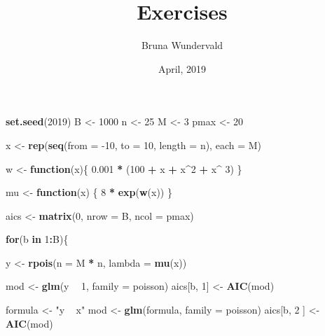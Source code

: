 \documentclass[]{article}
\title{Exercises}
\author{Bruna Wundervald}
\date{April, 2019}
\newenvironment{Shaded}{\begin{snugshade}}{\end{snugshade}}
\newcommand{\ControlFlowTok}[1]{\textcolor[rgb]{0.13,0.29,0.53}{\textbf{#1}}}
\newcommand{\DataTypeTok}[1]{\textcolor[rgb]{0.13,0.29,0.53}{#1}}
\newcommand{\DecValTok}[1]{\textcolor[rgb]{0.00,0.00,0.81}{#1}}
\newcommand{\FloatTok}[1]{\textcolor[rgb]{0.00,0.00,0.81}{#1}}
\newcommand{\KeywordTok}[1]{\textcolor[rgb]{0.13,0.29,0.53}{\textbf{#1}}}
\newcommand{\NormalTok}[1]{#1}
\newcommand{\OperatorTok}[1]{\textcolor[rgb]{0.81,0.36,0.00}{\textbf{#1}}}
\newcommand{\StringTok}[1]{\textcolor[rgb]{0.31,0.60,0.02}{#1}}
\begin{document}
\maketitle

\begin{Shaded}
\begin{Highlighting}[]
\KeywordTok{set.seed}\NormalTok{(}\DecValTok{2019}\NormalTok{)}
\NormalTok{B <-}\StringTok{ }\DecValTok{1000}
\NormalTok{n <-}\StringTok{ }\DecValTok{25}
\NormalTok{M <-}\StringTok{ }\DecValTok{3}
\NormalTok{pmax <-}\StringTok{ }\DecValTok{20}

\NormalTok{x <-}\StringTok{ }\KeywordTok{rep}\NormalTok{(}\KeywordTok{seq}\NormalTok{(}\DataTypeTok{from =} \DecValTok{-10}\NormalTok{, }\DataTypeTok{to =} \DecValTok{10}\NormalTok{, }\DataTypeTok{length =}\NormalTok{ n), }\DataTypeTok{each =}\NormalTok{ M)}

\NormalTok{w <-}\StringTok{ }\ControlFlowTok{function}\NormalTok{(x)\{}
  \FloatTok{0.001} \OperatorTok{*}\StringTok{ }\NormalTok{(}\DecValTok{100} \OperatorTok{+}\StringTok{ }\NormalTok{x }\OperatorTok{+}\StringTok{ }\NormalTok{x}\OperatorTok{^}\DecValTok{2} \OperatorTok{+}\StringTok{ }\NormalTok{x}\OperatorTok{^}\StringTok{ }\DecValTok{3}\NormalTok{)}
\NormalTok{\}}

\NormalTok{mu <-}\StringTok{ }\ControlFlowTok{function}\NormalTok{(x) \{}
  \DecValTok{8} \OperatorTok{*}\StringTok{ }\KeywordTok{exp}\NormalTok{(}\KeywordTok{w}\NormalTok{(x))}
\NormalTok{\}}

\NormalTok{aics <-}\StringTok{ }\KeywordTok{matrix}\NormalTok{(}\DecValTok{0}\NormalTok{, }\DataTypeTok{nrow =}\NormalTok{ B, }\DataTypeTok{ncol =}\NormalTok{ pmax)}


\ControlFlowTok{for}\NormalTok{(b }\ControlFlowTok{in} \DecValTok{1}\OperatorTok{:}\NormalTok{B)\{}
  
\NormalTok{  y <-}\StringTok{ }\KeywordTok{rpois}\NormalTok{(}\DataTypeTok{n =}\NormalTok{ M }\OperatorTok{*}\StringTok{ }\NormalTok{n, }\DataTypeTok{lambda =} \KeywordTok{mu}\NormalTok{(x))}
  
\NormalTok{  mod <-}\StringTok{ }\KeywordTok{glm}\NormalTok{(y }\OperatorTok{~}\StringTok{ }\DecValTok{1}\NormalTok{, }\DataTypeTok{family =}\NormalTok{ poisson)}
\NormalTok{  aics[b, }\DecValTok{1}\NormalTok{] <-}\StringTok{ }\KeywordTok{AIC}\NormalTok{(mod)}
  
\NormalTok{  formula <-}\StringTok{ "y ~ x"}
\NormalTok{  mod <-}\StringTok{ }\KeywordTok{glm}\NormalTok{(formula, }\DataTypeTok{family =}\NormalTok{ poisson)}
\NormalTok{  aics[b, }\DecValTok{2}\NormalTok{ ] <-}\StringTok{ }\KeywordTok{AIC}\NormalTok{(mod)}
  

\end{Highlighting}
\end{Shaded}
\end{document}
